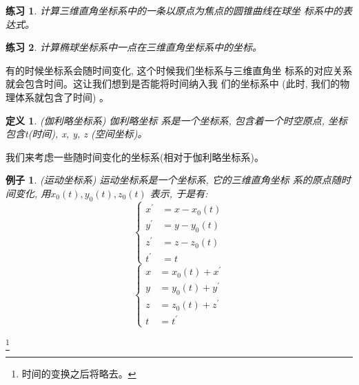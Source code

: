 \documentclass{ctexart}
\numberwithin{equation}{subsection}
\numberwithin{theorem}{subsection}
\newtheorem{definition} {定义}
\numberwithin{definition}{subsection}
\numberwithin{proof}{subsection}
\numberwithin{lemma}{subsection}
\newtheorem{example}    {例子}
\numberwithin{example}{subsection}
\numberwithin{remark}{subsection}
\numberwithin{corollary}{subsection}
\newtheorem{exercise}   {练习}
\numberwithin{exercise}{subsection}
\numberwithin{problem}{subsection}
\numberwithin{question}{section}
\numberwithin{method}{subsection}
\begin{document}
    \begin{exercise}
        \label{1.1.1}
        计算三维直角坐标系中的一条以原点为焦点的圆锥曲线在球坐
        标系中的表达式。
    \end{exercise}
    \begin{exercise}
        \label{1.1.2}
        计算椭球坐标系中一点在三维直角坐标系中的坐标。
    \end{exercise}

    有的时候坐标系会随时间变化, 这个时候我们坐标系与三维直角坐
    标系的对应关系就会包含时间。这让我们想到是否能将时间纳入我
    们的坐标系中 (此时, 我们的物理体系就包含了时间) 。

    \begin{definition}
        \label{1.1 def:Galileo frame}
        (伽利略坐标系) 伽利略坐标
        系是一个坐标系, 包含着一个时空原点, 坐标包含t(时间), 
        x, y, z (空间坐标)。
    \end{definition}

    我们来考虑一些随时间变化的坐标系(相对于伽利略坐标系)。

    \begin{example}
        \label{1.1 ex:moving frame}
        (运动坐标系) 运动坐标系是一个坐标系, 它的三维直角坐标
        系的原点随时间变化, 用\(x_0(t), y_0(t), z_0(t)\)
        表示, 于是有:
        \begin{equation}
            \begin{cases}
                x ^ \prime &= x - x_0(t) \\
                y ^ \prime &= y - y_0(t) \\
                z ^ \prime &= z - z_0(t) \\
                t ^ \prime &= t
            \end{cases}
        \end{equation}
        \begin{equation}
            \begin{cases}
                x &= x_0(t) + x ^ \prime \\
                y &= y_0(t) + y ^ \prime \\
                z &= z_0(t) + z ^ \prime \\
                t &= t ^ \prime
            \end{cases}
        \end{equation}
    \end{example}
    \footnote{时间的变换之后将略去。}
\end{document}
